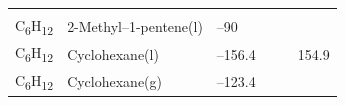 \documentclass[
  9pt,
]{extbook}
\theoremstyle{definition}
\theoremstyle{definition}
\theoremstyle{definition}
\theoremstyle{remark}
\begin{document}
\begin{longtable}[]{@{}llllll@{}}
\begin{minipage}[t]{0.14\columnwidth}
\strut
\end{minipage}\tabularnewline
\begin{minipage}[t]{0.07\columnwidth}\raggedright
C\textsubscript{6}H\textsubscript{12}\strut
\end{minipage} & \begin{minipage}[t]{0.17\columnwidth}\raggedright
2-Methyl--1-pentene(l)\strut
\end{minipage} & \begin{minipage}[t]{0.15\columnwidth}\raggedright
--90\strut
\end{minipage} & \begin{minipage}[t]{0.15\columnwidth}\raggedright
\strut
\end{minipage} & \begin{minipage}[t]{0.14\columnwidth}\raggedright
\strut
\end{minipage} & \begin{minipage}[t]{0.14\columnwidth}\raggedright
\strut
\end{minipage}\tabularnewline
\begin{minipage}[t]{0.07\columnwidth}\raggedright
C\textsubscript{6}H\textsubscript{12}\strut
\end{minipage} & \begin{minipage}[t]{0.17\columnwidth}\raggedright
Cyclohexane(l)\strut
\end{minipage} & \begin{minipage}[t]{0.15\columnwidth}\raggedright
--156.4\strut
\end{minipage} & \begin{minipage}[t]{0.15\columnwidth}\raggedright
\strut
\end{minipage} & \begin{minipage}[t]{0.14\columnwidth}\raggedright
\strut
\end{minipage} & \begin{minipage}[t]{0.14\columnwidth}\raggedright
154.9\strut
\end{minipage}\tabularnewline
\begin{minipage}[t]{0.07\columnwidth}\raggedright
C\textsubscript{6}H\textsubscript{12}\strut
\end{minipage} & \begin{minipage}[t]{0.17\columnwidth}\raggedright
Cyclohexane(g)\strut
\end{minipage} & \begin{minipage}[t]{0.15\columnwidth}\raggedright
--123.4\strut
\end{minipage} & \begin{minipage}[t]{0.15\columnwidth}\raggedright

\end{minipage}
\end{longtable}
\end{document}
